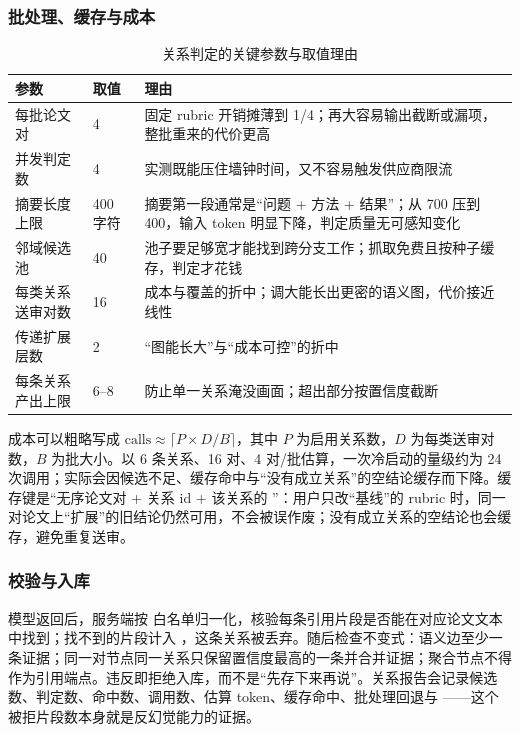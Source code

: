 \subsubsection{批处理、缓存与成本}

\begin{table}[htbp]
  \centering
  \small
  \caption{关系判定的关键参数与取值理由}
  \label{tab:relation-params}
  \begin{tabularx}{\textwidth}{L{3.3cm}C{1.6cm}Y}
    \toprule
\textbf{参数} & \textbf{取值} & \textbf{理由} \\
    \midrule
    每批论文对 & 4 & 固定 rubric 开销摊薄到 1/4；再大容易输出截断或漏项，整批重来的代价更高 \\
    并发判定数 & 4 & 实测既能压住墙钟时间，又不容易触发供应商限流 \\
    摘要长度上限 & 400 字符 & 摘要第一段通常是“问题 + 方法 + 结果”；从 700 压到 400，输入 token 明显下降，判定质量无可感知变化 \\
    邻域候选池 & 40 & 池子要足够宽才能找到跨分支工作；抓取免费且按种子缓存，判定才花钱 \\
    每类关系送审对数 & 16 & 成本与覆盖的折中；调大能长出更密的语义图，代价接近线性 \\
    传递扩展层数 & 2 & “图能长大”与“成本可控”的折中 \\
    每条关系产出上限 & 6--8 & 防止单一关系淹没画面；超出部分按置信度截断 \\
    \bottomrule
  \end{tabularx}
\end{table}

成本可以粗略写成 $\text{calls} \approx \lceil P \times D / B \rceil$，其中 $P$ 为启用关系数，$D$ 为每类送审对数，$B$ 为批大小。以 6 条关系、16 对、4 对/批估算，一次冷启动的量级约为 24 次调用；实际会因候选不足、缓存命中与“没有成立关系”的空结论缓存而下降。缓存键是“无序论文对 + 关系 id + 该关系的 ”：用户只改“基线”的 rubric 时，同一对论文上“扩展”的旧结论仍然可用，不会被误作废；没有成立关系的空结论也会缓存，避免重复送审。

\subsubsection{校验与入库}

模型返回后，服务端按  白名单归一化，核验每条引用片段是否能在对应论文文本中找到；找不到的片段计入 ，这条关系被丢弃。随后检查不变式：语义边至少一条证据；同一对节点同一关系只保留置信度最高的一条并合并证据；聚合节点不得作为引用端点。违反即拒绝入库，而不是“先存下来再说”。关系报告会记录候选数、判定数、命中数、调用数、估算 token、缓存命中、批处理回退与 ——这个被拒片段数本身就是反幻觉能力的证据。

